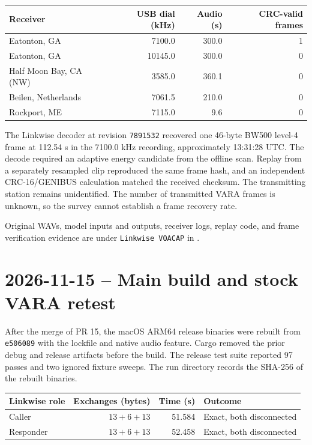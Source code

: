 \documentclass[11pt,a4paper]{article}
\newcommand{\pathtext}[1]{\path{#1}}
\begin{document}
\begin{center}
\begin{tabular}{@{}lrrr@{}}
\toprule
Receiver & USB dial (kHz) & Audio (s) & CRC-valid frames \\
\midrule
Eatonton, GA & 7100.0 & 300.0 & 1 \\
Eatonton, GA & 10145.0 & 300.0 & 0 \\
Half Moon Bay, CA (NW) & 3585.0 & 360.1 & 0 \\
Beilen, Netherlands & 7061.5 & 210.0 & 0 \\
Rockport, ME & 7115.0 & 9.6 & 0 \\
\bottomrule
\end{tabular}
\end{center}

The Linkwise decoder at revision \texttt{7891532} recovered one
46-byte BW500 level-4 frame at 112.54 s in the 7100.0 kHz recording,
approximately 13:31:28 UTC. The decode required an adaptive energy
candidate from the offline scan. Replay from a separately resampled
clip reproduced the same frame hash, and an independent CRC-16/GENIBUS
calculation matched the received checksum. The transmitting station
remains unidentified. The number of transmitted VARA frames is unknown,
so the survey cannot establish a frame recovery rate.

Original WAVs, model inputs and outputs, receiver logs, replay code,
and frame verification evidence are under
\texttt{Linkwise VOACAP} in \pathtext{~/Documents/Codex}.

\section{2026-11-15 -- Main build and stock VARA retest}

After the merge of PR 15, the macOS ARM64 release binaries were rebuilt
from \texttt{e506089} with the lockfile and native audio feature. Cargo
removed the prior debug and release artifacts before the build. The
release test suite reported 97 passes and two ignored fixture sweeps.
The run directory records the SHA-256 of the rebuilt binaries.

\begin{center}
\begin{tabular}{@{}lrrl@{}}
\toprule
Linkwise role & Exchanges (bytes) & Time (s) & Outcome \\
\midrule
Caller & $13+6+13$ & 51.584 & Exact, both disconnected \\
Responder & $13+6+13$ & 52.458 & Exact, both disconnected \\
\bottomrule
\end{tabular}
\end{center}
\end{document}
